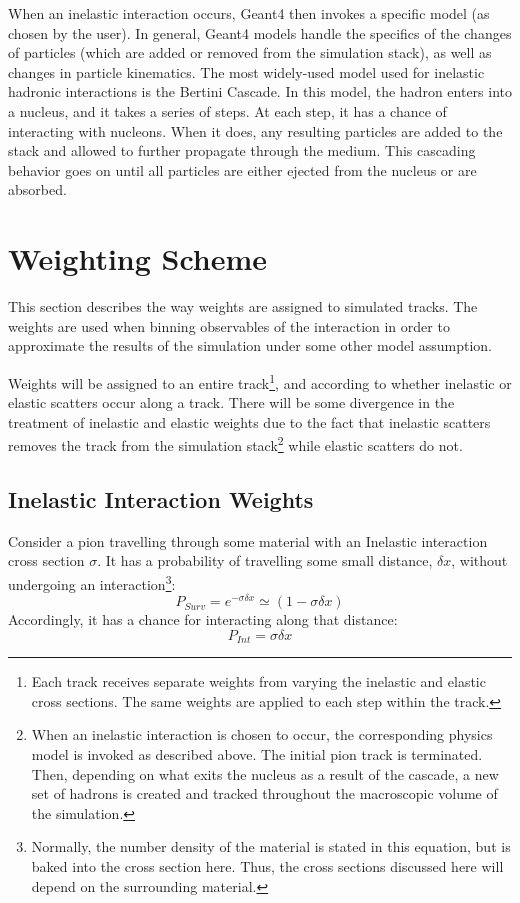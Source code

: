 \documentclass[12pt]{article}
\begin{document}
When an inelastic interaction occurs, Geant4 then invokes a specific model (as chosen by the user). In general, Geant4 models handle the specifics of the changes of particles (which are added or removed from the simulation stack), as well as changes in particle kinematics. The most widely-used model used for inelastic hadronic interactions is the Bertini Cascade. In this model, the hadron enters into a nucleus, and it takes a series of steps. At each step, it has a chance of interacting with nucleons. When it does, any resulting particles are added to the stack and allowed to further propagate through the medium. This cascading behavior goes on until all particles are either ejected from the nucleus or are absorbed. 

\section{Weighting Scheme}
This section describes the way weights are assigned to simulated tracks. The weights are used when binning observables of the interaction in order to approximate the results of the simulation under some other model assumption.

Weights will be assigned to an entire track\footnote{Each track receives separate weights from varying the inelastic and elastic cross sections. The same weights are applied to each step within the track.}, and according to whether inelastic or elastic scatters occur along a track. There will be some divergence in the treatment of inelastic and elastic weights due to the fact that inelastic scatters removes the track from the simulation stack\footnote{When an inelastic interaction is chosen to occur, the corresponding physics model is invoked as described above. The initial pion track is terminated. Then, depending on what exits the nucleus as a result of the cascade, a new set of hadrons is created and tracked throughout the macroscopic volume of the simulation.} while elastic scatters do not. 

\subsection{Inelastic Interaction 
Weights}\label{subsec:inel_weights}

Consider a pion travelling through some material with an Inelastic interaction cross section $\sigma$. It has a probability of travelling some small distance, $\delta x$, without undergoing an interaction\footnote{Normally, the number density of the material is stated in this equation, but is baked into the cross section here. Thus, the cross sections discussed here will depend on the surrounding material.}:
\begin{equation}\label{eq:Psurv}
P_{Surv} = e^{- \sigma \delta x} \simeq (1 - \sigma \delta x)
\end{equation}
Accordingly, it has a chance for interacting along that distance:
\begin{equation}\label{eq:Pint}
P_{Int} = \sigma \delta x
\end{equation}
\end{document}
